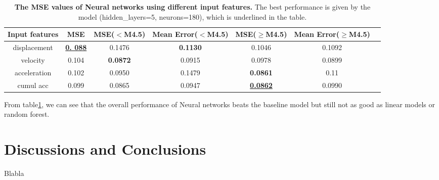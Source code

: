 \documentclass{article} %
\begin{document}
\begin{table}[htbp]
	\small
	\centering
	\begin{tabular}{@{}|c|c|c|c|c|c|c|@{}} %
		\hline
		\cline{2-6}
		Input features & MSE & MSE($<$M4.5) & Mean Error($<$M4.5)& MSE($\geq$M4.5) & Mean Error($\geq$M4.5)\\ 
		\cline{2-6} \hline \hline
		displacement & \textbf{\underline{0. 088}} & 0.1476 & \textbf{0.1130} & 0.1046  & 0.1092 \\
		 velocity & 0.104  & \textbf{0.0872} & 0.0915 & 0.0978 & 0.0899 \\ 
		acceleration &  0.102 & 0.0950 & 0.1479 & \textbf{0.0861} & 0.11 \\ 
		 cumul acc & 0.099 & 0.0865 & 0.0947 & \textbf{\underline{0.0862}}  & 0.0990 \\ 
		 \hline
	\end{tabular}
	\caption{{\bf The MSE values of Neural networks using different input features.} The best performance is given by the model (hidden\_layers=5, neurons=180), which is underlined in the table.}
	\label{tab:nn_perf}
\end{table}

From table\ref{tab:nn_perf}, we can see that the overall performance of Neural networks beats the baseline model but still not as good as linear models or random forest.




\section{Discussions and Conclusions}
Blabla



\newpage



\end{document}
